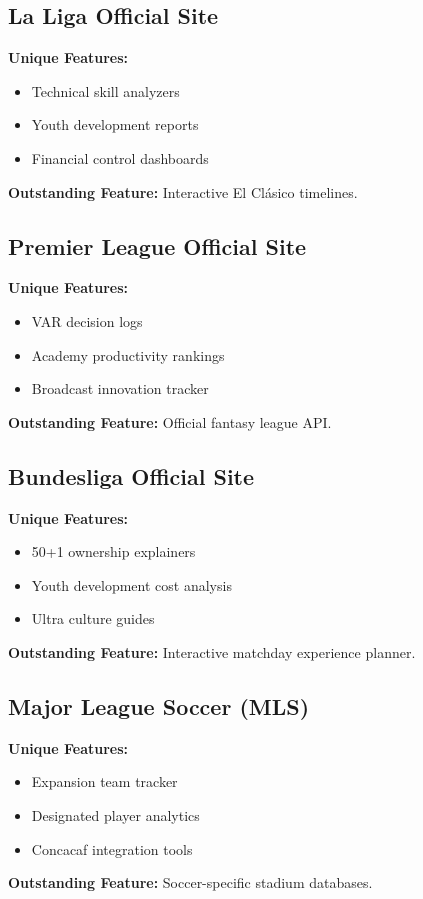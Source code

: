 \subsection{La Liga Official Site}
\textbf{Unique Features:}
\begin{itemize}
    \item Technical skill analyzers
    \item Youth development reports
    \item Financial control dashboards
\end{itemize}
\textbf{Outstanding Feature:} Interactive El Clásico timelines\parencite{laliga}.

\subsection{Premier League Official Site}
\textbf{Unique Features:}
\begin{itemize}
    \item VAR decision logs
    \item Academy productivity rankings
    \item Broadcast innovation tracker
\end{itemize}
\textbf{Outstanding Feature:} Official fantasy league API\parencite{premier}.

\subsection{Bundesliga Official Site}
\textbf{Unique Features:}
\begin{itemize}
    \item 50+1 ownership explainers
    \item Youth development cost analysis
    \item Ultra culture guides
\end{itemize}
\textbf{Outstanding Feature:} Interactive matchday experience planner\parencite{bundesliga}.

\subsection{Major League Soccer (MLS)}
\textbf{Unique Features:}
\begin{itemize}
    \item Expansion team tracker
    \item Designated player analytics
    \item Concacaf integration tools
\end{itemize}
\textbf{Outstanding Feature:} Soccer-specific stadium databases\parencite{mls}.

